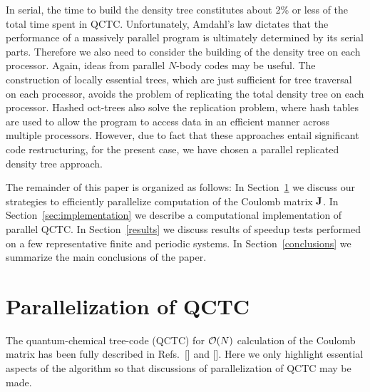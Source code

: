\commentoutA{\documentclass[prl,aps,twocolumn,twocolumngrid,superbib]{revtex4}}
\begin{document}
In serial, the time to build the density tree constitutes about 2\% or
less of the total time spent in QCTC.  Unfortunately, Amdahl's law
dictates that the performance of a massively parallel program is
ultimately determined by its serial parts.  Therefore we also need to
consider the building of the density tree on each processor.  Again,
ideas from parallel $N$-body codes may be useful.  The construction of
locally essential trees, which are just sufficient for tree traversal
on each processor,\cite{MWarren92} avoids the problem of replicating
the total density tree on each processor.  Hashed
oct-trees\cite{MWarren93,MWarren95b} also solve the replication
problem, where hash tables are used to allow the program to access
data in an efficient manner across multiple processors. However, due
to fact that these approaches entail significant code restructuring,
for the present case, we have chosen a parallel replicated density
tree approach.

The remainder of this paper is organized as follows: In
Section~\ref{ParaQCTC} we discuss our strategies to efficiently
parallelize computation of the Coulomb matrix ${\bf J}$. In
Section~\ref{sec:implementation} we describe a computational
implementation of parallel QCTC. In Section~\ref{results} we discuss
results of speedup tests performed on a few representative finite and
periodic systems. In Section~\ref{conclusions} we summarize the main
conclusions of the paper.

\section{Parallelization of QCTC}
\label{ParaQCTC}
The quantum-chemical tree-code (QCTC) for ${\cal O}(N)$ calculation of
the Coulomb matrix has been fully described in
Refs.~[] and [].
Here we only highlight essential aspects of the algorithm so that
discussions of parallelization of QCTC may be made.
\end{document}
